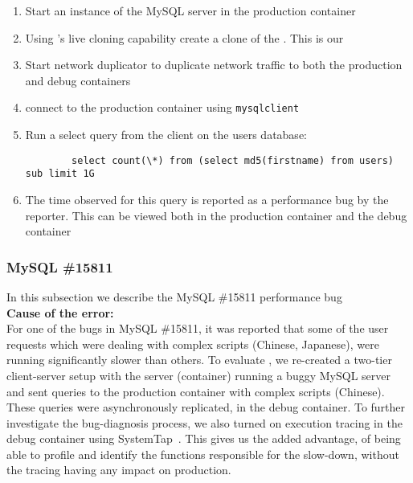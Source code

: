 \begin{adjustwidth}{0.5cm}{}
	\begin{enumerate}
		\item Start an instance of the MySQL server in the production container
		\item Using \parikshan's live cloning capability create a clone of the \productioncontainer. This is our \debugcontainer
		\item Start network duplicator to duplicate network traffic to both the production and debug containers
		\item connect to the production container using \texttt{mysqlclient}
		\item Run a select query from the client on the users database:
		
		\begin{lstlisting}
		select count(\*) from (select md5(firstname) from users) sub limit 1G
		\end{lstlisting}
		
		\item The time observed for this query is reported as a performance bug by the reporter. This can be viewed both in the production container and the debug container
		
	\end{enumerate}
\end{adjustwidth}	



\subsubsection{MySQL \#15811}
\label{sec:mySQL15811}

In this subsection we describe the MySQL \#15811 performance bug \\

\noindent \textbf{Cause of the error:} \\

For one of the bugs in  MySQL \#15811, it was reported that some of the user requests which were dealing with complex scripts (Chinese, Japanese), were running significantly slower than others.
To evaluate \parikshan, we re-created a two-tier client-server setup with the server (container) running a buggy MySQL server and sent queries to the production container with complex scripts (Chinese).
These queries were asynchronously replicated, in the debug container. To further investigate the bug-diagnosis process, we also turned on execution tracing in the debug container using SystemTap~\cite{systemtap}.
This gives us the added advantage, of being able to profile and identify the functions responsible for the slow-down, without the tracing having any impact on production.\\

